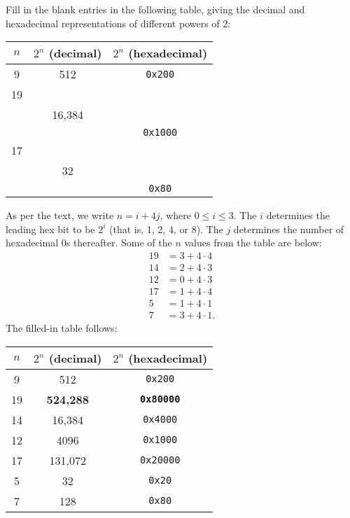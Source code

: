 \documentclass[12pt]{article}
\newenvironment{ex}[2][Exercise]{\begin{trivlist}
		\item[\hskip \labelsep {\bfseries #1}\hskip \labelsep {\bfseries #2.}]}{\end{trivlist}}
\newenvironment{sol}[1][Solution]{\begin{trivlist}
		\item[\hskip \labelsep {\bfseries #1:}]}{\end{trivlist}}
\begin{document}
\begin{ex}{2.2}
	Fill in the blank entries in the following table, giving the decimal and
	hexadecimal representations of different powers of $2$:
	\begin{center}
		\begin{tabular}{ccc}
			$n$ & $2^n$ (decimal) & $2^n$ (hexadecimal)\\
			\hline
			9 & 512 & \texttt{0x200}\\
			19 & \makebox[1cm]{\hrulefill} & \makebox[1cm]{\hrulefill}\\
			\makebox[1cm]{\hrulefill} & 16,384 & \makebox[1cm]{\hrulefill}\\
			\makebox[1cm]{\hrulefill} & \makebox[1cm]{\hrulefill} & \texttt{0x1000}\\
			17 & \makebox[1cm]{\hrulefill} & \makebox[1cm]{\hrulefill}\\
			\makebox[1cm]{\hrulefill} & 32 & \makebox[1cm]{\hrulefill}\\
			\makebox[1cm]{\hrulefill} & \makebox[1cm]{\hrulefill} & \texttt{0x80}
		\end{tabular}
	\end{center}
\end{ex}

\begin{sol}
	As per the text, we write $n=i+4j$, where $0\leq i\leq 3$. The
	$i$ determines the leading hex bit to be $2^i$ (that is, 1, 2, 4, or 8).
	The $j$ determines the number of hexadecimal 0s thereafter. Some
	of the $n$ values from the table are below:
	\begin{align*}
		19&=3+4\cdot 4\\
		14&=2+4\cdot 3\\
		12&=0+4\cdot 3\\
		17&=1+4\cdot 4\\
		5 &=1+4\cdot 1\\
		7 &=3+4\cdot 1.
	\end{align*}
	The filled-in table follows:
	\begin{center}
		\begin{tabular}{ccc}
			$n$ & $2^n$ (decimal) & $2^n$ (hexadecimal)\\
			\hline
			9 & 512 & \texttt{0x200}\\
			19 & \textbf{524,288} & \textbf{\texttt{0x80000}}\\
			14 & 16,384 & \texttt{0x4000}\\
			12 & 4096 & \texttt{0x1000}\\
			17 & 131,072 & \texttt{0x20000}\\
			5 & 32 & \texttt{0x20}\\
			7 & 128 & \texttt{0x80}
		\end{tabular}
	\end{center}
\end{sol}
\end{document}
